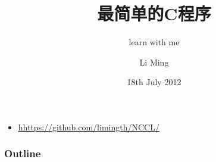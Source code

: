 \documentclass[t]{beamer}
\title{最简单的C程序}
\subtitle{learn with me}
\author{Li Ming}
\institute{Aka @ Beijing}
\date{18th July 2012}
\begin{document}
\begin{frame}
\titlepage
\begin{itemize}
\item 	\url{hhttps://github.com/limingth/NCCL/}
\end{itemize}
\end{frame}

\begin{frame}
\frametitle{Outline}
\end{frame}



\end{document}
